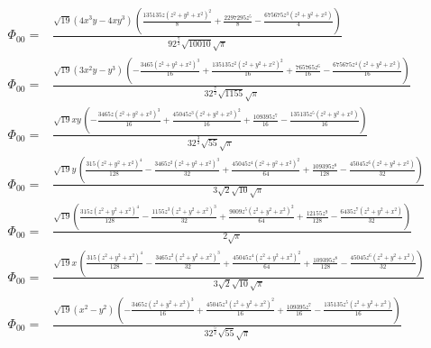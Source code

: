 \documentclass[10pt]{article}
\begin{document}
\begin{align*}
\Phi_{00} = &\frac{\sqrt{19} \left( 4 {{x}^{3}} y-4 x {{y}^{3}}\right) \, \left( \frac{135135 z {{\left( {{z}^{2}}+{{y}^{2}}+{{x}^{2}}\right) }^{2}}}{8}+\frac{2297295 {{z}^{5}}}{8}-\frac{675675 {{z}^{3}} \left( {{z}^{2}}+{{y}^{2}}+{{x}^{2}}\right) }{4}\right) }{9 {{2}^{\frac{7}{2}}} \sqrt{10010} \sqrt{\ensuremath{\pi} }}\\
\Phi_{00} = &\frac{\sqrt{19} \left( 3 {{x}^{2}} y-{{y}^{3}}\right) \, \left( -\frac{3465 {{\left( {{z}^{2}}+{{y}^{2}}+{{x}^{2}}\right) }^{3}}}{16}+\frac{135135 {{z}^{2}} {{\left( {{z}^{2}}+{{y}^{2}}+{{x}^{2}}\right) }^{2}}}{16}+\frac{765765 {{z}^{6}}}{16}-\frac{675675 {{z}^{4}} \left( {{z}^{2}}+{{y}^{2}}+{{x}^{2}}\right) }{16}\right) }{3 {{2}^{\frac{7}{2}}} \sqrt{1155} \sqrt{\ensuremath{\pi} }}\\
\Phi_{00} = &\frac{\sqrt{19} x y\, \left( -\frac{3465 z {{\left( {{z}^{2}}+{{y}^{2}}+{{x}^{2}}\right) }^{3}}}{16}+\frac{45045 {{z}^{3}} {{\left( {{z}^{2}}+{{y}^{2}}+{{x}^{2}}\right) }^{2}}}{16}+\frac{109395 {{z}^{7}}}{16}-\frac{135135 {{z}^{5}} \left( {{z}^{2}}+{{y}^{2}}+{{x}^{2}}\right) }{16}\right) }{3 {{2}^{\frac{3}{2}}} \sqrt{55} \sqrt{\ensuremath{\pi} }}\\
\Phi_{00} = &\frac{\sqrt{19} y\, \left( \frac{315 {{\left( {{z}^{2}}+{{y}^{2}}+{{x}^{2}}\right) }^{4}}}{128}-\frac{3465 {{z}^{2}} {{\left( {{z}^{2}}+{{y}^{2}}+{{x}^{2}}\right) }^{3}}}{32}+\frac{45045 {{z}^{4}} {{\left( {{z}^{2}}+{{y}^{2}}+{{x}^{2}}\right) }^{2}}}{64}+\frac{109395 {{z}^{8}}}{128}-\frac{45045 {{z}^{6}} \left( {{z}^{2}}+{{y}^{2}}+{{x}^{2}}\right) }{32}\right) }{3 \sqrt{2} \sqrt{10} \sqrt{\ensuremath{\pi} }}\\
\Phi_{00} = &\frac{\sqrt{19} \left( \frac{315 z {{\left( {{z}^{2}}+{{y}^{2}}+{{x}^{2}}\right) }^{4}}}{128}-\frac{1155 {{z}^{3}} {{\left( {{z}^{2}}+{{y}^{2}}+{{x}^{2}}\right) }^{3}}}{32}+\frac{9009 {{z}^{5}} {{\left( {{z}^{2}}+{{y}^{2}}+{{x}^{2}}\right) }^{2}}}{64}+\frac{12155 {{z}^{9}}}{128}-\frac{6435 {{z}^{7}} \left( {{z}^{2}}+{{y}^{2}}+{{x}^{2}}\right) }{32}\right) }{2 \sqrt{\ensuremath{\pi} }}\\
\Phi_{00} = &\frac{\sqrt{19} x\, \left( \frac{315 {{\left( {{z}^{2}}+{{y}^{2}}+{{x}^{2}}\right) }^{4}}}{128}-\frac{3465 {{z}^{2}} {{\left( {{z}^{2}}+{{y}^{2}}+{{x}^{2}}\right) }^{3}}}{32}+\frac{45045 {{z}^{4}} {{\left( {{z}^{2}}+{{y}^{2}}+{{x}^{2}}\right) }^{2}}}{64}+\frac{109395 {{z}^{8}}}{128}-\frac{45045 {{z}^{6}} \left( {{z}^{2}}+{{y}^{2}}+{{x}^{2}}\right) }{32}\right) }{3 \sqrt{2} \sqrt{10} \sqrt{\ensuremath{\pi} }}\\
\Phi_{00} = &\frac{\sqrt{19} \left( {{x}^{2}}-{{y}^{2}}\right) \, \left( -\frac{3465 z {{\left( {{z}^{2}}+{{y}^{2}}+{{x}^{2}}\right) }^{3}}}{16}+\frac{45045 {{z}^{3}} {{\left( {{z}^{2}}+{{y}^{2}}+{{x}^{2}}\right) }^{2}}}{16}+\frac{109395 {{z}^{7}}}{16}-\frac{135135 {{z}^{5}} \left( {{z}^{2}}+{{y}^{2}}+{{x}^{2}}\right) }{16}\right) }{3 {{2}^{\frac{5}{2}}} \sqrt{55} \sqrt{\ensuremath{\pi} }}\\

\end{align*}
\end{document}
